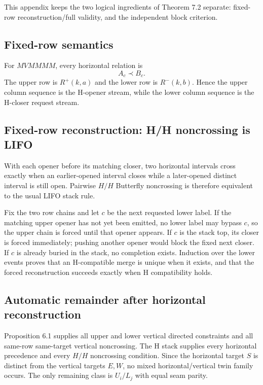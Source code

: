 \documentclass[11pt]{article}
\theoremstyle{definition}
\theoremstyle{remark}
\begin{document}
This appendix keeps the two logical ingredients of Theorem 7.2 separate:
fixed-row reconstruction/full validity, and the independent block
criterion.

\subsection{Fixed-row semantics}\label{e.1.-fixed-row-semantics}

For \(MVMMMM\), every horizontal relation is \[
A_c\prec B_c.
\] The upper row is \(R^+(k,a)\) and the lower row is \(R^-(k,b)\).
Hence the upper column sequence is the H-opener stream, while the lower
column sequence is the H-closer request stream.

\subsection{Fixed-row reconstruction: H/H noncrossing is
LIFO}\label{e.2.-fixed-row-reconstruction-hh-noncrossing-is-lifo}

With each opener before its matching closer, two horizontal intervals
cross exactly when an earlier-opened interval closes while a
later-opened distinct interval is still open. Pairwise \(H/H\) Butterfly
noncrossing is therefore equivalent to the usual LIFO stack rule.

Fix the two row chains and let \(c\) be the next requested lower label.
If the matching upper opener has not yet been emitted, no lower label
may bypass \(c\), so the upper chain is forced until that opener
appears. If \(c\) is the stack top, its closer is forced immediately;
pushing another opener would block the fixed next closer. If \(c\) is
already buried in the stack, no completion exists. Induction over the
lower events proves that an H-compatible merge is unique when it exists,
and that the forced reconstruction succeeds exactly when H compatibility
holds.

\subsection{Automatic remainder after horizontal
reconstruction}\label{e.3.-automatic-remainder-after-horizontal-reconstruction}

Proposition 6.1 supplies all upper and lower vertical directed
constraints and all same-row same-target vertical noncrossing. The H
stack supplies every horizontal precedence and every \(H/H\) noncrossing
condition. Since the horizontal target \(S\) is distinct from the
vertical targets \(E,W\), no mixed horizontal/vertical twin family
occurs. The only remaining class is \(U_i/L_j\) with equal seam parity.
\end{document}

